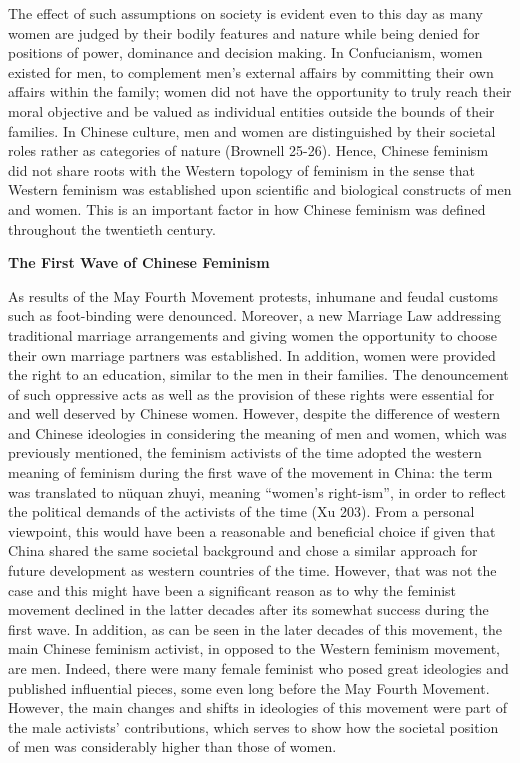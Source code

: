 \documentclass[12pt]{article}
\begin{document}
\begin{flushleft}
		The effect of such assumptions on society is evident even to this day as many women are judged by their bodily features and nature while being denied for positions of power, dominance and decision making. In Confucianism, women existed for men, to complement men’s external affairs by committing their own affairs within the family; women did not have the opportunity to truly reach their moral objective and be valued as individual entities outside the bounds of their families. In Chinese culture, men and women are distinguished by their societal roles rather as categories of nature (Brownell 25-26). Hence, Chinese feminism did not share roots with the Western topology of feminism in the sense that Western feminism was established upon scientific and biological constructs of men and women. This is an important factor in how Chinese feminism was defined throughout the twentieth century. 
		
		\vspace{0.3cm}
		\noindent \textbf{The First Wave of Chinese Feminism}
		
		\noindent 
		As results of the May Fourth Movement protests, inhumane and feudal customs such as foot-binding were denounced. Moreover, a new Marriage Law addressing traditional marriage arrangements and giving women the opportunity to choose their own marriage partners was established. In addition, women were provided the right to an education, similar to the men in their families. The denouncement of such oppressive acts as well as the provision of these rights were essential for and well deserved by Chinese women. However, despite the difference of western and Chinese ideologies in considering the meaning of men and women, which was previously mentioned, the feminism activists of the time adopted the western meaning of feminism during the first wave of the movement in China: the term was translated to nüquan zhuyi, meaning “women’s right-ism”, in order to reflect the political demands of the activists of the time (Xu 203). From a personal viewpoint, this would have been a reasonable and beneficial choice if given that China shared the same societal background and chose a similar approach for future development as western countries of the time. However, that was not the case and this might have been a significant reason as to why the feminist movement declined in the latter decades after its somewhat success during the first wave. In addition, as can be seen in the later decades of this movement, the main Chinese feminism activist, in opposed to the Western feminism movement, are men. Indeed, there were many female feminist who posed great ideologies and published influential pieces, some even long before the May Fourth Movement. However, the main changes and shifts in ideologies of this movement were part of the male activists’ contributions, which serves to show how the societal position of men was considerably higher than those of women. 
		

\end{flushleft}
\end{document}
